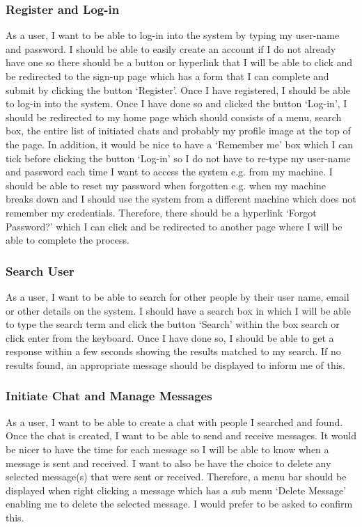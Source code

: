 \documentclass{article}
\begin{document}
    \subsubsection{Register and Log-in} 
    As a user, I want to be able to log-in into the system by typing my user-name and password. I should be able to easily create an account if I do not already have one so there should be a button or hyperlink that I will be able to click and be redirected to the sign-up page which has a form that I can complete and submit by clicking the button ‘Register’. Once I have registered, I should be able to log-in into the system. Once I have done so and clicked the button ‘Log-in’, I should be redirected to my home page which should consists of a menu, search box, the entire list of initiated chats and probably my profile image at the top of the page. 
    In addition, it would be nice to have a ‘Remember me’ box which I can tick before clicking the button ‘Log-in’ so I do not have to re-type my user-name and password each time I want to access the system e.g. from my machine. I should be able to reset my password when forgotten e.g. when my machine breaks down and I should use the system from a different machine which does not remember my credentials. Therefore, there should be a hyperlink ‘Forgot Password?’ which I can click and be redirected to another page where I will be able to complete the process. 
    
    \subsubsection{Search User} 
    As a user, I want to be able to search for other people by their user name, email or other details on the system. I should have a search box in which I will be able to type the search term and click the button ‘Search’ within the box search or click enter from the keyboard. Once I have done so, I should be able to get a response within a few seconds showing the results matched to my search. If no results found, an appropriate message should be displayed to inform me of this. 
    
    \subsubsection{Initiate Chat and Manage Messages}
    As a user, I want to be able to create a chat with people I searched and found. Once the chat is created, I want to be able to send and receive messages. It would be nicer to have the time for each message so I will be able to know when a message is sent and received. I want to also be have the choice to delete any selected message(s) that were sent or received. Therefore, a menu bar should be displayed when right clicking a message which has a sub menu ‘Delete Message’ enabling me to delete the selected message. I would prefer to be asked to confirm this. 
    
\end{document}
